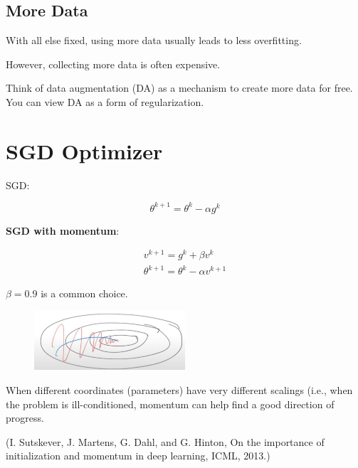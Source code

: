 \documentclass{report}
\begin{document}
\subsection{More Data}

\begin{concept}
    With all else fixed, using more data usually leads to less overfitting.

    However, collecting more data is often expensive.

    Think of data augmentation (DA) as a mechanism to create more data for free. You can view DA as a form of regularization.
\end{concept}

\section{SGD Optimizer}

\begin{definition}
    SGD:

    $$
    \theta^{k+1}=\theta^{k}-\alpha g^{k}
    $$

    \textbf{SGD with momentum}:

    $$
    \begin{gathered}
    v^{k+1}=g^{k}+\beta v^{k} \\
    \theta^{k+1}=\theta^{k}-\alpha v^{k+1}
    \end{gathered}
    $$

    $\beta=0.9$ is a common choice.

    \begin{figure}[H]
        \centering
        \includegraphics[width=0.5\textwidth]{.././assets/6.9.png}
    \end{figure}

    When different coordinates (parameters) have very different scalings (i.e., when the problem is ill-conditioned, momentum can help find a good direction of progress.

    (I. Sutskever, J. Martens, G. Dahl, and G. Hinton, On the importance of initialization and momentum in deep learning, ICML, 2013.)
\end{definition}
\end{document}
